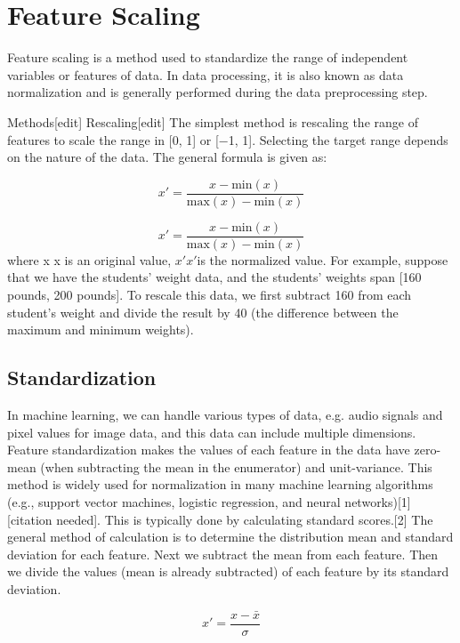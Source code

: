 \documentclass[11pt]{article} %
\begin{document}
\newapge
\section{Feature Scaling}
Feature scaling is a method used to standardize the range of independent variables or features of data. In data processing, it is also known as data normalization and is generally performed during the data preprocessing step.

Methods[edit]
Rescaling[edit]
The simplest method is rescaling the range of features to scale the range in [0, 1] or [−1, 1]. Selecting the target range depends on the nature of the data. The general formula is given as:

                                   
  
    
    \[{\displaystyle x'={\frac {x-{\text{min}}(x)}{{\text{max}}(x)-{\text{min}}(x)}}}\]
  
\[x'={\frac  {x-{\text{min}}(x)}{{\text{max}}(x)-{\text{min}}(x)}} \]
where {\displaystyle x} x is an original value, ${\displaystyle x'} x' $is the normalized value. For example, suppose that we have the students' weight data, and the students' weights span [160 pounds, 200 pounds]. To rescale this data, we first subtract 160 from each student's weight and divide the result by 40 (the difference between the maximum and minimum weights).

\subsection{Standardization}
In machine learning, we can handle various types of data, e.g. audio signals and pixel values for image data, and this data can include multiple dimensions. Feature standardization makes the values of each feature in the data have zero-mean (when subtracting the mean in the enumerator) and unit-variance. This method is widely used for normalization in many machine learning algorithms (e.g., support vector machines, logistic regression, and neural networks)[1][citation needed]. This is typically done by calculating standard scores.[2] The general method of calculation is to determine the distribution mean and standard deviation for each feature. Next we subtract the mean from each feature. Then we divide the values (mean is already subtracted) of each feature by its standard deviation.

                                   
  
    
   \[ {\displaystyle x'={\frac {x-{\bar {x}}}{\sigma }}}\]
  
\end{document}
